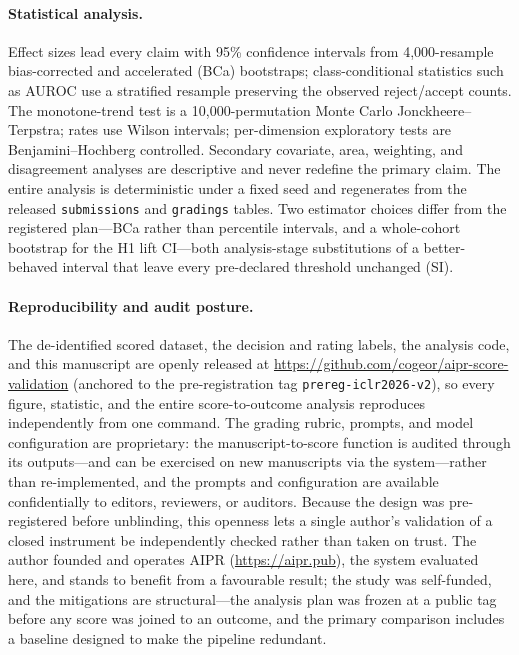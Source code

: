 \paragraph{Statistical analysis.}
Effect sizes lead every claim with 95\% confidence intervals from 4{,}000-resample bias-corrected
and accelerated (BCa) bootstraps; class-conditional statistics such as AUROC use a stratified
resample preserving the observed reject/accept counts. The monotone-trend test is a
10{,}000-permutation Monte Carlo Jonckheere--Terpstra; rates use Wilson intervals; per-dimension
exploratory tests are Benjamini--Hochberg controlled. Secondary covariate, area, weighting, and
disagreement analyses are descriptive and never redefine the primary claim. The entire analysis is
deterministic under a fixed seed and regenerates from the released \texttt{submissions} and
\texttt{gradings} tables. Two estimator choices differ from the registered plan---BCa rather than
percentile intervals, and a whole-cohort bootstrap for the H1 lift CI---both analysis-stage
substitutions of a better-behaved interval that leave every pre-declared threshold unchanged (SI).

\paragraph{Reproducibility and audit posture.}
The de-identified scored dataset, the decision and rating labels, the analysis code, and this
manuscript are openly released at \url{https://github.com/cogeor/aipr-score-validation}
(anchored to the pre-registration tag \texttt{prereg-iclr2026-v2}), so every figure,
statistic, and the entire score-to-outcome analysis reproduces independently from one command. The grading rubric, prompts, and model configuration are proprietary: the
manuscript-to-score function is audited through its outputs---and can be exercised on new
manuscripts via the system---rather than re-implemented, and the prompts and configuration are
available confidentially to editors, reviewers, or auditors. Because the design was pre-registered
before unblinding, this openness lets a single author's validation of a closed instrument be
independently checked rather than taken on trust. The author founded and operates AIPR
(\url{https://aipr.pub}), the system evaluated here, and stands to benefit from a favourable result;
the study was self-funded, and the mitigations are structural---the analysis plan was frozen at a
public tag before any score was joined to an outcome, and the primary comparison includes a baseline
designed to make the pipeline redundant.
